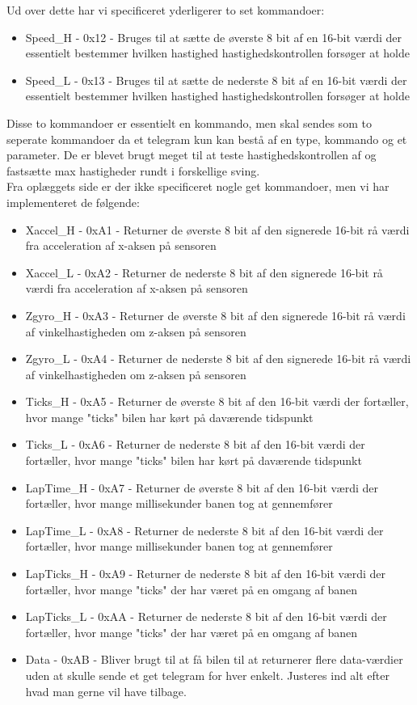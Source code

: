 Ud over dette har vi specificeret yderligerer to set kommandoer:
\begin{itemize}
	\item Speed\_H - 0x12 - Bruges til at sætte de øverste 8 bit af en 16-bit værdi der essentielt bestemmer hvilken hastighed hastighedskontrollen forsøger at holde
	\item Speed\_L - 0x13 - Bruges til at sætte de nederste 8 bit af en 16-bit værdi der essentielt bestemmer hvilken hastighed hastighedskontrollen forsøger at holde
\end{itemize}

Disse to kommandoer er essentielt en kommando, men skal sendes som to seperate kommandoer da et telegram kun kan bestå af en type, kommando og et parameter. De er blevet brugt meget til at teste hastighedskontrollen af og fastsætte max hastigheder rundt i forskellige sving.\\

Fra oplæggets side er der ikke specificeret nogle get kommandoer, men vi har implementeret de følgende:
\begin{itemize}
	\item Xaccel\_H - 0xA1 - Returner de øverste 8 bit af den signerede 16-bit rå værdi fra acceleration af x-aksen på sensoren
	\item Xaccel\_L - 0xA2 - Returner de nederste 8 bit af den signerede 16-bit rå værdi fra acceleration af x-aksen på sensoren
	\item Zgyro\_H - 0xA3 - Returner de øverste 8 bit af den signerede 16-bit rå værdi af vinkelhastigheden om z-aksen på sensoren
	\item Zgyro\_L - 0xA4 - Returner de nederste 8 bit af den signerede 16-bit rå værdi af vinkelhastigheden om z-aksen på sensoren
	\item Ticks\_H - 0xA5 - Returner de øverste 8 bit af den 16-bit værdi der fortæller, hvor mange "ticks" bilen har kørt på daværende tidspunkt
	\item Ticks\_L - 0xA6 - Returner de nederste 8 bit af den 16-bit værdi der fortæller, hvor mange "ticks" bilen har kørt på daværende tidspunkt
	\item LapTime\_H - 0xA7 - Returner de øverste 8 bit af den 16-bit værdi der fortæller, hvor mange millisekunder banen tog at gennemfører
	\item LapTime\_L - 0xA8 - Returner de nederste 8 bit af den 16-bit værdi der fortæller, hvor mange millisekunder banen tog at gennemfører
	\item LapTicks\_H - 0xA9 - Returner de nederste 8 bit af den 16-bit værdi der fortæller, hvor mange "ticks" der har været på en omgang af banen
	\item LapTicks\_L - 0xAA - Returner de nederste 8 bit af den 16-bit værdi der fortæller, hvor mange "ticks" der har været på en omgang af banen
	\item Data - 0xAB - Bliver brugt til at få bilen til at returnerer flere data-værdier uden at skulle sende et get telegram for hver enkelt. Justeres ind alt efter hvad man gerne vil have tilbage.
	
\end{itemize}

